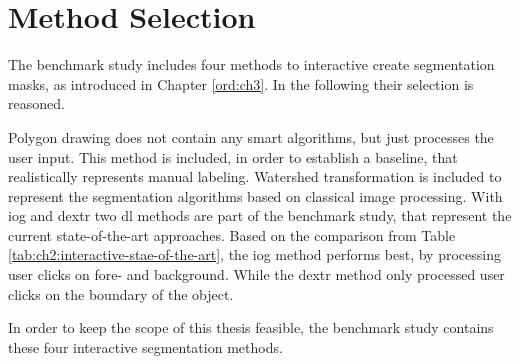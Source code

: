 
\section{Method Selection}\label{ord:ch4:sec2}

The benchmark study includes four methods to interactive create segmentation masks, as introduced in Chapter \ref{ord:ch3}. 
In the following their selection is reasoned.

Polygon drawing does not contain any smart algorithms, but just processes the user input.
This method is included, in order to establish a baseline, that realistically represents manual labeling.
Watershed transformation is included to represent the segmentation algorithms based on classical image processing.
With \gls{iog} and \gls{dextr} two \gls{dl} methods are part of the benchmark study, that represent the current state-of-the-art approaches.
Based on the comparison from Table \ref{tab:ch2:interactive-stae-of-the-art}, the \gls{iog} method performs best, by processing user clicks on fore- and background.
While the \gls{dextr} method only processed user clicks on the boundary of the object.

In order to keep the scope of this thesis feasible, the benchmark study contains these four interactive segmentation methods.
